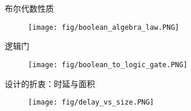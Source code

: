 \begin{frame}{布尔代数性质}
\begin{figure}
\centering
\texttt{[image: fig/boolean\_algebra\_law.PNG]}
\end{figure}
\end{frame}

\begin{frame}{逻辑门}
\begin{figure}
\centering
\texttt{[image: fig/boolean\_to\_logic\_gate.PNG]}
\end{figure}
\end{frame}

\begin{frame}{设计的折衷：时延与面积}
\begin{figure}
\centering
\texttt{[image: fig/delay\_vs\_size.PNG]}
\end{figure}
\end{frame}

